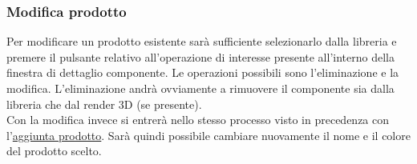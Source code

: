     \newpage

    \subsubsection{Modifica prodotto}\label{sec:prodotti:modifica}
        Per modificare un prodotto esistente sarà sufficiente selezionarlo dalla libreria e premere il pulsante relativo all'operazione di interesse presente 
        all'interno della finestra di dettaglio componente. Le operazioni possibili sono l'eliminazione e la modifica.  
        L'eliminazione andrà ovviamente a rimuovere il componente sia dalla libreria che dal render 3D (se presente).\\
        
        \noindent Con la modifica invece si entrerà nello stesso processo visto in precedenza con l'\hyperref[sec:prodotti:aggiunta]{aggiunta prodotto}. 
        Sarà quindi possibile cambiare nuovamente il nome e il colore del prodotto scelto. 
       
    \newpage
